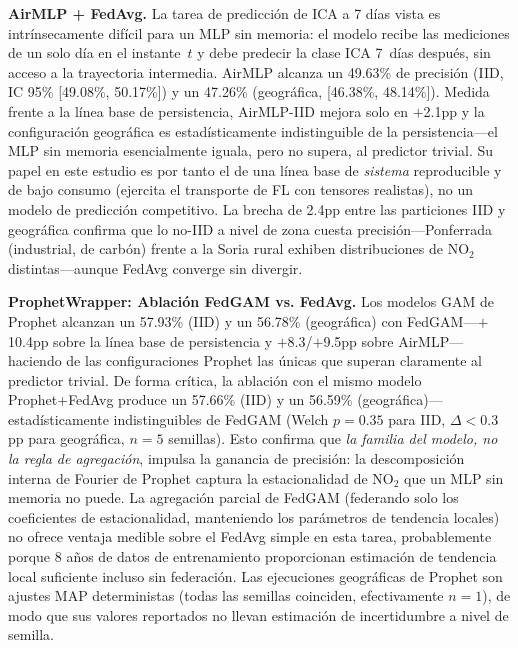 \documentclass[journal]{IEEEtran}
\begin{document}
\textbf{AirMLP + FedAvg.} La tarea de predicción de ICA a 7 días vista es intrínsecamente difícil para un MLP sin memoria: el modelo recibe las mediciones de un solo día en el instante~$t$ y debe predecir la clase ICA 7~días después, sin acceso a la trayectoria intermedia. AirMLP alcanza un 49.63\% de precisión (IID, IC 95\% [49.08\%, 50.17\%]) y un 47.26\% (geográfica, [46.38\%, 48.14\%]). Medida frente a la línea base de persistencia, AirMLP-IID mejora solo en $+$2.1pp y la configuración geográfica es estadísticamente indistinguible de la persistencia---el MLP sin memoria esencialmente iguala, pero no supera, al predictor trivial. Su papel en este estudio es por tanto el de una línea base de \emph{sistema} reproducible y de bajo consumo (ejercita el transporte de FL con tensores realistas), no un modelo de predicción competitivo. La brecha de 2.4pp entre las particiones IID y geográfica confirma que lo no-IID a nivel de zona cuesta precisión---Ponferrada (industrial, de carbón) frente a la Soria rural exhiben distribuciones de NO$_2$ distintas---aunque FedAvg converge sin divergir.

\textbf{ProphetWrapper: Ablación FedGAM vs. FedAvg.} Los modelos GAM de Prophet alcanzan un 57.93\% (IID) y un 56.78\% (geográfica) con FedGAM---$+$10.4pp sobre la línea base de persistencia y $+$8.3/$+$9.5pp sobre AirMLP---haciendo de las configuraciones Prophet las únicas que superan claramente al predictor trivial. De forma crítica, la ablación con el mismo modelo Prophet+FedAvg produce un 57.66\% (IID) y un 56.59\% (geográfica)---estadísticamente indistinguibles de FedGAM (Welch $p{=}0.35$ para IID, $\Delta{<}0.3$pp para geográfica, $n{=}5$ semillas). Esto confirma que \emph{la familia del modelo, no la regla de agregación}, impulsa la ganancia de precisión: la descomposición interna de Fourier de Prophet captura la estacionalidad de NO$_2$ que un MLP sin memoria no puede. La agregación parcial de FedGAM (federando solo los coeficientes de estacionalidad, manteniendo los parámetros de tendencia locales) no ofrece ventaja medible sobre el FedAvg simple en esta tarea, probablemente porque 8 años de datos de entrenamiento proporcionan estimación de tendencia local suficiente incluso sin federación. Las ejecuciones geográficas de Prophet son ajustes MAP deterministas (todas las semillas coinciden, efectivamente $n{=}1$), de modo que sus valores reportados no llevan estimación de incertidumbre a nivel de semilla.
\end{document}
